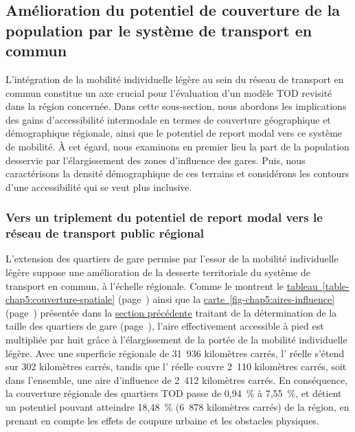 \begin{refsegment}
\subsection{Amélioration du potentiel de couverture de la population par le système de transport en commun
    \label{chap5:couverture-population}
    }

L'intégration de la mobilité individuelle légère au sein du réseau de transport en commun constitue un axe crucial pour l'évaluation d'un modèle \acrshort{TOD} revisité dans la région concernée. Dans cette sous-section, nous abordons les implications des gains d'accessibilité intermodale en termes de couverture géographique et démographique régionale, ainsi que le potentiel de report modal vers ce système de mobilité. À cet égard, nous examinons en premier lieu la part de la population desservie par l'élargissement des zones d'influence des gares. Puis, nous caractérisons la densité démographique de ces terrains et considérons les contours d'une accessibilité qui se veut plus inclusive.%

\subsubsection*{Vers un triplement du potentiel de report modal vers le réseau de transport public régional
    \label{chap5:couverture-regionale}
    }
    
L'extension des quartiers de gare permise par l'essor de la mobilité individuelle légère suppose une amélioration de la desserte territoriale du système de transport en commun, à l'échelle régionale. Comme le montrent le \hyperref[table-chap5:couverture-spatiale]{tableau~\ref{table-chap5:couverture-spatiale}} (page~\pageref{table-chap5:couverture-spatiale}) ainsi que la \hyperref[fig-chap5:impedance-distances]{carte~\ref{fig-chap5:aires-influence}} (page~\pageref{fig-chap5:aires-influence}) présentée dans la \hyperref[chap5:taille-aire-secondaire]{section précédente} traitant de la détermination de la taille des quartiers de gare (page~\pageref{chap5:taille-aire-secondaire}), l'aire effectivement accessible à pied est multipliée par huit grâce à l'élargissement de la portée de la mobilité individuelle légère. Avec une superficie régionale de 31~936 kilomètres carrés, l' réelle s'étend sur 302 kilomètres carrés, tandis que l' réelle couvre 2~110 kilomètres carrés, soit dans l'ensemble, une aire d'influence de 2~412 kilomètres carrés. En conséquence, la couverture régionale des quartiers \acrshort{TOD} passe de 0,94~\% à 7,55~\%, et détient un potentiel pouvant atteindre 18,48~\% (6~878 kilomètres carrés) de la région, en prenant en compte les effets de \gls{coupure urbaine} et les obstacles physiques.%


\end{refsegment}

